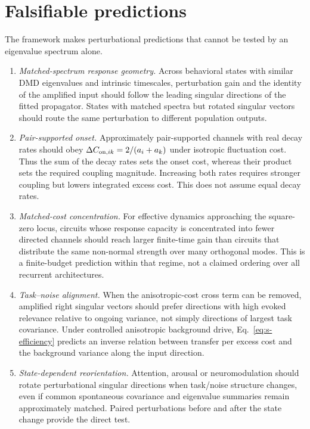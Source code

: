 \documentclass[
  aps,prl,preprint,notitlepage,superscriptaddress,nofootinbib,longbibliography,
  amsmath,amssymb
]{revtex4-2}
\begin{document}
\section{Falsifiable predictions}
\label{sec:s-predictions}

The framework makes perturbational predictions that cannot be tested by an
eigenvalue spectrum alone.
\begin{enumerate}
\item \emph{Matched-spectrum response geometry.}  Across behavioral states
with similar DMD eigenvalues and intrinsic timescales, perturbation gain and the
identity of the amplified input should follow the leading singular directions
of the fitted propagator.  States with matched spectra but rotated singular
vectors should route the same perturbation to different population outputs.

\item \emph{Pair-supported onset.}  Approximately pair-supported channels with
real decay rates should obey
$\Delta C_{{\rm on},ik}=2/(a_i+a_k)$ under isotropic fluctuation cost.  Thus
the sum of the decay rates sets the onset cost, whereas their product sets the
required coupling magnitude.  Increasing both rates requires stronger coupling
but lowers integrated excess cost.  This does not assume equal decay rates.

\item \emph{Matched-cost concentration.}  For effective dynamics approaching
the square-zero locus, circuits whose response capacity is concentrated into
fewer directed channels should reach larger finite-time gain than circuits that
distribute the same non-normal strength over many orthogonal modes.  This is a
finite-budget prediction within that regime, not a claimed ordering over all
recurrent architectures.

\item \emph{Task--noise alignment.}  When the anisotropic-cost cross term can be
removed, amplified right singular vectors should
prefer directions with high evoked relevance relative to ongoing variance, not
simply directions of largest task covariance.  Under controlled anisotropic
background drive, Eq.~\eqref{eq:s-efficiency} predicts an inverse relation
between transfer per excess cost and the background variance along the input
direction.

\item \emph{State-dependent reorientation.}  Attention, arousal or
neuromodulation should rotate perturbational singular directions when task/noise
structure changes, even if common spontaneous covariance and eigenvalue
summaries remain approximately matched.  Paired perturbations before and after
the state change provide the direct test.


\end{enumerate}
\end{document}
